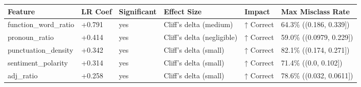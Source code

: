 \begin{tabular}{llllll}
\toprule
Feature & LR Coef & Significant & Effect Size & Impact & Max Misclass Rate \\
\midrule
function\_word\_ratio & +0.791 & yes & Cliff's delta (medium) & ↑ Correct & 64.3\% ((0.186, 0.339]) \\
pronoun\_ratio & +0.414 & yes & Cliff's delta (negligible) & ↑ Correct & 59.0\% ((0.0979, 0.229]) \\
punctuation\_density & +0.342 & yes & Cliff's delta (small) & ↑ Correct & 82.1\% ((0.174, 0.271]) \\
sentiment\_polarity & +0.314 & yes & Cliff's delta (small) & ↑ Correct & 71.4\% ((0.0, 0.102]) \\
adj\_ratio & +0.258 & yes & Cliff's delta (small) & ↑ Correct & 78.6\% ((0.032, 0.0611]) \\
\bottomrule
\end{tabular}
